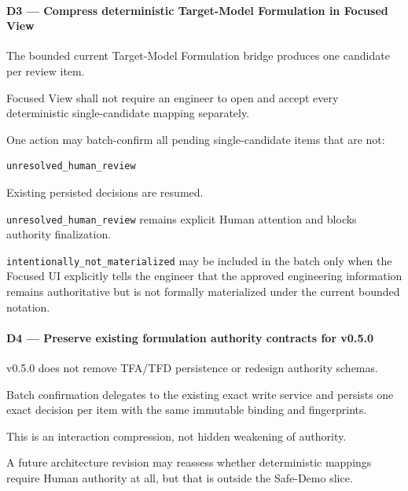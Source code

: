 \hypertarget{d3--compress-deterministic-target-model-formulation-in-focused-view}{%
\paragraph{D3 --- Compress deterministic Target-Model Formulation in Focused View}\label{d3--compress-deterministic-target-model-formulation-in-focused-view}}

The bounded current Target-Model Formulation bridge produces one candidate per review item.

Focused View shall not require an engineer to open and accept every deterministic single-candidate mapping separately.

One action may batch-confirm all pending single-candidate items that are not:

\begin{verbatim}
unresolved_human_review
\end{verbatim}

Existing persisted decisions are resumed.

\texttt{unresolved\_human\_review} remains explicit Human attention and blocks authority finalization.

\texttt{intentionally\_not\_materialized} may be included in the batch only when the Focused UI explicitly tells the engineer that the approved engineering information remains authoritative but is not formally materialized under the current bounded notation.

\hypertarget{d4--preserve-existing-formulation-authority-contracts-for-v050}{%
\paragraph{D4 --- Preserve existing formulation authority contracts for v0.5.0}\label{d4--preserve-existing-formulation-authority-contracts-for-v050}}

v0.5.0 does not remove TFA/TFD persistence or redesign authority schemas.

Batch confirmation delegates to the existing exact write service and persists one exact decision per item with the same immutable binding and fingerprints.

This is an interaction compression, not hidden weakening of authority.

A future architecture revision may reassess whether deterministic mappings require Human authority at all, but that is outside the Safe-Demo slice.

